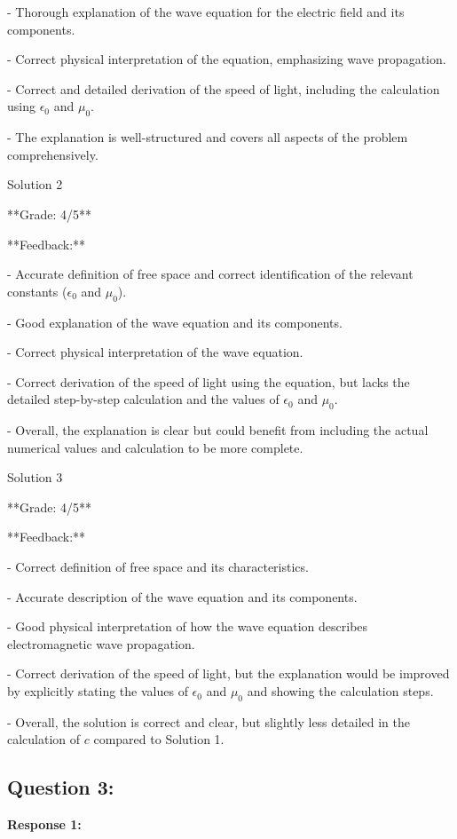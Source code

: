 \documentclass[a4paper,11pt]{article}
\begin{document}
- Thorough explanation of the wave equation for the electric field and its components.

- Correct physical interpretation of the equation, emphasizing wave propagation.

- Correct and detailed derivation of the speed of light, including the calculation using \(\epsilon_0\) and \(\mu_0\).

- The explanation is well-structured and covers all aspects of the problem comprehensively.

Solution 2

**Grade: 4/5**

**Feedback:**

- Accurate definition of free space and correct identification of the relevant constants (\(\epsilon_0\) and \(\mu_0\)).

- Good explanation of the wave equation and its components.

- Correct physical interpretation of the wave equation.

- Correct derivation of the speed of light using the equation, but lacks the detailed step-by-step calculation and the values of \(\epsilon_0\) and \(\mu_0\).

- Overall, the explanation is clear but could benefit from including the actual numerical values and calculation to be more complete.

Solution 3

**Grade: 4/5**

**Feedback:**

- Correct definition of free space and its characteristics.

- Accurate description of the wave equation and its components.

- Good physical interpretation of how the wave equation describes electromagnetic wave propagation.

- Correct derivation of the speed of light, but the explanation would be improved by explicitly stating the values of \(\epsilon_0\) and \(\mu_0\) and showing the calculation steps.

- Overall, the solution is correct and clear, but slightly less detailed in the calculation of \(c\) compared to Solution 1.

\subsection*{Question 3:}

\textbf{Response 1:}
\end{document}
